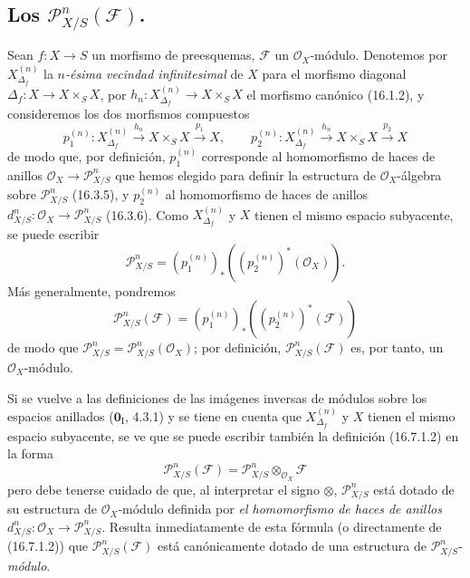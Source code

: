 \subsection{Los $\mathscr{P}_{X/S}^n(\mathscr{F})$.}
\label{IV.16.7}

\begin{env}[16.7.1]
\label{IV.16.7.1}
Sean $f:X\to S$ un morfismo de preesquemas, $\mathscr{F}$ un
$\mathcal{O}_X$-módulo. Denotemos por $X_{\Delta_f}^{(n)}$ la \emph{$n$-ésima
vecindad infinitesimal} de $X$ para el morfismo diagonal
$\Delta_f:X\to X\times_S X$, por
$h_n:X_{\Delta_f}^{(n)}\to X\times_S X$ el morfismo canónico (16.1.2), y
consideremos los dos morfismos compuestos
\[
  p_1^{(n)}:X_{\Delta_f}^{(n)}\xrightarrow{h_n}X\times_S X
  \xrightarrow{p_1}X,\qquad
  p_2^{(n)}:X_{\Delta_f}^{(n)}\xrightarrow{h_n}X\times_S X
  \xrightarrow{p_2}X
\]
de modo que, por definición, $p_1^{(n)}$ corresponde al homomorfismo de
haces de anillos $\mathcal{O}_X\to\mathscr{P}_{X/S}^n$ que hemos
elegido para definir la estructura de $\mathcal{O}_X$-álgebra sobre
$\mathscr{P}_{X/S}^n$ (16.3.5), y $p_2^{(n)}$ al homomorfismo de haces
de anillos $d_{X/S}^n:\mathcal{O}_X\to\mathscr{P}_{X/S}^n$ (16.3.6). Como
$X_{\Delta_f}^{(n)}$ y $X$ tienen el mismo espacio subyacente, se puede escribir
\[
  \mathscr{P}_{X/S}^n
  =(p_1^{(n)})_*((p_2^{(n)})^*(\mathcal{O}_X)).
  \tag{16.7.1.1}
  \label{IV.16.7.1.1}
\]
Más generalmente, pondremos
\[
  \mathscr{P}_{X/S}^n(\mathscr{F})
  =(p_1^{(n)})_*((p_2^{(n)})^*(\mathscr{F}))
  \tag{16.7.1.2}
  \label{IV.16.7.1.2}
\]
de modo que
$\mathscr{P}_{X/S}^n=\mathscr{P}_{X/S}^n(\mathcal{O}_X)$; por definición,
$\mathscr{P}_{X/S}^n(\mathscr{F})$ es, por tanto, un $\mathcal{O}_X$-módulo.
\end{env}

\begin{env}[16.7.2]
\label{IV.16.7.2}
Si se vuelve a las definiciones de las imágenes inversas de módulos sobre los
espacios anillados ($\mathbf{0}_{\mathrm I}$, 4.3.1) y se tiene en cuenta que
$X_{\Delta_f}^{(n)}$ y $X$ tienen el mismo espacio subyacente, se ve que se puede
escribir también la definición (16.7.1.2) en la forma
\[
  \mathscr{P}_{X/S}^n(\mathscr{F})
  =\mathscr{P}_{X/S}^n\otimes_{\mathcal{O}_X}\mathscr{F}
  \tag{16.7.2.1}
  \label{IV.16.7.2.1}
\]
pero debe tenerse cuidado de que, al interpretar el signo $\otimes$,
$\mathscr{P}_{X/S}^n$ está dotado de su estructura de $\mathcal{O}_X$-módulo
definida por \emph{el homomorfismo de haces de anillos}
$d_{X/S}^n:\mathcal{O}_X\to\mathscr{P}_{X/S}^n$. Resulta inmediatamente de esta
fórmula (o directamente de (16.7.1.2)) que
$\mathscr{P}_{X/S}^n(\mathscr{F})$ está canónicamente dotado de una estructura de
$\mathscr{P}_{X/S}^n$-\emph{módulo}.
\end{env}

